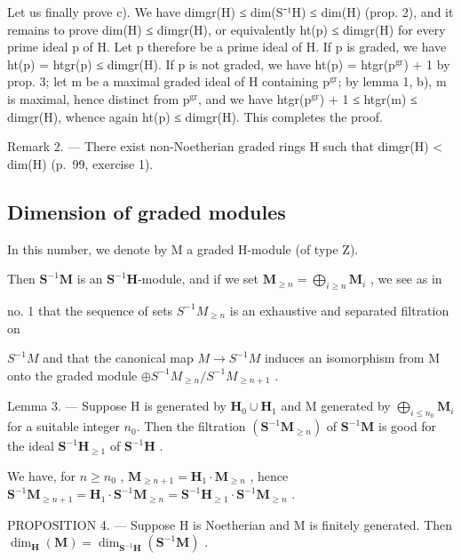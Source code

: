 Let us finally prove c). We have dimgr(H) ≤ dim(S⁻¹H) ≤ dim(H) (prop. 2), and it remains to prove dim(H) ≤ dimgr(H), or equivalently ht(p) ≤ dimgr(H) for every prime ideal p of H. Let p therefore be a prime ideal of H. If p is graded, we have ht(p) = htgr(p) ≤ dimgr(H). If p is not graded, we have ht(p) = htgr(p\(^{\mathrm{gr}}\)) + 1 by prop. 3; let m be a maximal graded ideal of H containing p\(^{\mathrm{gr}}\); by lemma 1, b), m is maximal, hence distinct from p\(^{\mathrm{gr}}\), and we have htgr(p\(^{\mathrm{gr}}\)) + 1 ≤ htgr(m) ≤ dimgr(H), whence again ht(p) ≤ dimgr(H). This completes the proof.

Remark 2. --- There exist non-Noetherian graded rings H such that dimgr(H) \textless{} dim(H) (p.~99, exercise 1).

\subsection{Dimension of graded modules}

In this number, we denote by M a graded H-module (of type Z).

Then \(\mathbf{S}^{-1}\mathbf{M}\) is an \(\mathbf{S}^{-1}\mathbf{H}\)-module, and if we set \(\mathbf{M}_{\geqslant n} = \bigoplus_{i\geqslant n}\mathbf{M}_i\) , we see as in

no. 1 that the sequence of sets \(S^{-1}M_{\geqslant n}\) is an exhaustive and separated filtration on

\(S^{-1}M\) and that the canonical map \(M \to S^{-1}M\) induces an isomorphism from M onto the graded module \(\oplus S^{-1}M_{\geqslant n}/S^{-1}M_{\geqslant n+1}\) .

Lemma 3. --- Suppose H is generated by \(\mathbf{H}_{0} \cup \mathbf{H}_{1}\) and M generated by \(\bigoplus_{i \leqslant n_{0}} \mathbf{M}_{i}\) for a suitable integer \(n_{0}\). Then the filtration \((\mathbf{S}^{-1}\mathbf{M}_{\geqslant n})\) of \(\mathbf{S}^{-1}\mathbf{M}\) is good for the ideal \(\mathbf{S}^{-1}\mathbf{H}_{\geqslant 1}\) of \(\mathbf{S}^{-1}\mathbf{H}\) .

We have, for \(n \geqslant n_0\) , \(\mathbf{M}_{\geqslant n+1} = \mathbf{H}_1 \cdot \mathbf{M}_{\geqslant n}\) , hence \(\mathbf{S}^{-1} \mathbf{M}_{\geqslant n+1} = \mathbf{H}_1 \cdot \mathbf{S}^{-1} \mathbf{M}_{\geqslant n} = \mathbf{S}^{-1} \mathbf{H}_{\geqslant 1} \cdot \mathbf{S}^{-1} \mathbf{M}_{\geqslant n}\) .

PROPOSITION 4. --- Suppose H is Noetherian and M is finitely generated. Then \(\dim_{\mathbf{H}}(\mathbf{M}) = \dim_{\mathbf{S}^{-1}\mathbf{H}}(\mathbf{S}^{-1}\mathbf{M})\) .

